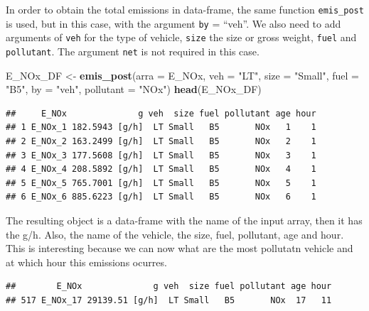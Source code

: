 \documentclass[12pt,graybox,envcountchap,sectrefs]{krantz}
\makeatletter
\newenvironment{Shaded}{\begin{snugshade}}{\end{snugshade}}
\newcommand{\KeywordTok}[1]{\textcolor[rgb]{0.13,0.29,0.53}{\textbf{#1}}}
\newcommand{\DataTypeTok}[1]{\textcolor[rgb]{0.13,0.29,0.53}{#1}}
\newcommand{\StringTok}[1]{\textcolor[rgb]{0.31,0.60,0.02}{#1}}
\newcommand{\OperatorTok}[1]{\textcolor[rgb]{0.81,0.36,0.00}{\textbf{#1}}}
\newcommand{\NormalTok}[1]{#1}
\newenvironment{kframe}{%
\medskip{}
\setlength{\fboxsep}{.8em}
 \def\at@end@of@kframe{}%
 \ifinner\ifhmode%
  \def\at@end@of@kframe{\end{minipage}}%
  \begin{minipage}{\columnwidth}%
 \fi\fi%
 \def\FrameCommand##1{\hskip\@totalleftmargin \hskip-\fboxsep
 \colorbox{shadecolor}{##1}\hskip-\fboxsep
     \hskip-\linewidth \hskip-\@totalleftmargin \hskip\columnwidth}%
 \MakeFramed {\advance\hsize-\width
   \@totalleftmargin\z@ \linewidth\hsize
   \@setminipage}}%
 {\par\unskip\endMakeFramed%
 \at@end@of@kframe}
\renewenvironment{Shaded}{\begin{kframe}}{\end{kframe}}
\theoremstyle{definition}
\theoremstyle{definition}
\theoremstyle{definition}
\theoremstyle{remark}
\makeatother
\begin{document}
In order to obtain the total emissions in data-frame, the same function
\texttt{emis\_post} is used, but in this case, with the argument
\texttt{by} = ``veh''. We also need to add arguments of \texttt{veh} for
the type of vehicle, \texttt{size} the size or gross weight,
\texttt{fuel} and \texttt{pollutant}. The argument \texttt{net} is not
required in this case.

\begin{Shaded}
\begin{Highlighting}[]
\NormalTok{E_NOx_DF <-}\StringTok{ }\KeywordTok{emis_post}\NormalTok{(}\DataTypeTok{arra =}\NormalTok{ E_NOx, }\DataTypeTok{veh =} \StringTok{"LT"}\NormalTok{, }\DataTypeTok{size =} \StringTok{"Small"}\NormalTok{, }\DataTypeTok{fuel =} \StringTok{"B5"}\NormalTok{,}
                      \DataTypeTok{by =} \StringTok{"veh"}\NormalTok{, }\DataTypeTok{pollutant =} \StringTok{"NOx"}\NormalTok{)}
\KeywordTok{head}\NormalTok{(E_NOx_DF)}
\end{Highlighting}
\end{Shaded}

\begin{verbatim}
##     E_NOx              g veh  size fuel pollutant age hour
## 1 E_NOx_1 182.5943 [g/h]  LT Small   B5       NOx   1    1
## 2 E_NOx_2 163.2499 [g/h]  LT Small   B5       NOx   2    1
## 3 E_NOx_3 177.5608 [g/h]  LT Small   B5       NOx   3    1
## 4 E_NOx_4 208.5892 [g/h]  LT Small   B5       NOx   4    1
## 5 E_NOx_5 765.7001 [g/h]  LT Small   B5       NOx   5    1
## 6 E_NOx_6 885.6223 [g/h]  LT Small   B5       NOx   6    1
\end{verbatim}

The resulting object is a data-frame with the name of the input array,
then it has the g/h. Also, the name of the vehicle, the size, fuel,
pollutant, age and hour. This is interesting because we can now what are
the most pollutatn vehicle and at which hour this emissions ocurres.

\begin{Shaded}
\end{Shaded}

\begin{verbatim}
##        E_NOx              g veh  size fuel pollutant age hour
## 517 E_NOx_17 29139.51 [g/h]  LT Small   B5       NOx  17   11
\end{verbatim}
\end{document}

